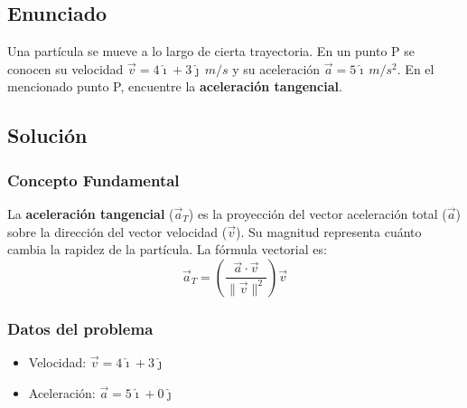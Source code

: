 \documentclass[12pt, a4paper]{article}
\begin{document}
\subsection*{Enunciado}
Una partícula se mueve a lo largo de cierta trayectoria. En un punto P se conocen su velocidad $\vec{v} = 4\hat{\imath} + 3\hat{\jmath} \, \si{m/s}$ y su aceleración $\vec{a} = 5\hat{\imath} \, \si{m/s^2}$. En el mencionado punto P, encuentre la \textbf{aceleración tangencial}.
\begin{center}
\end{center}

\subsection*{Solución}

\subsubsection*{Concepto Fundamental}
La \textbf{aceleración tangencial} ($\vec{a}_T$) es la proyección del vector aceleración total ($\vec{a}$) sobre la dirección del vector velocidad ($\vec{v}$). Su magnitud representa cuánto cambia la rapidez de la partícula.
La fórmula vectorial es:
\begin{equation}
\vec{a}_T = \left( \frac{\vec{a} \cdot \vec{v}}{\|\vec{v}\|^2} \right) \vec{v}
\end{equation}

\subsubsection*{Datos del problema}
\begin{itemize}
    \item Velocidad: $\vec{v} = 4\hat{\imath} + 3\hat{\jmath}$
    \item Aceleración: $\vec{a} = 5\hat{\imath} + 0\hat{\jmath}$
\end{itemize}
\end{document}
